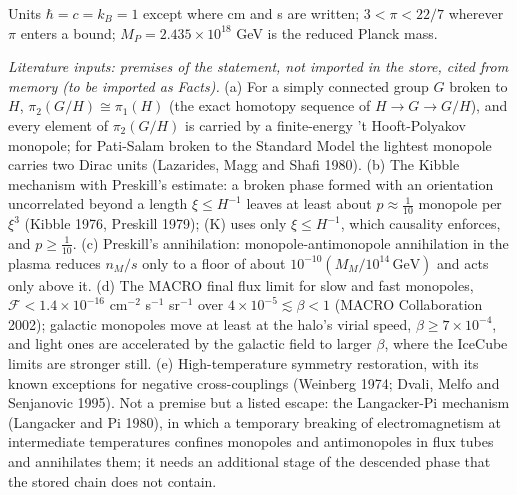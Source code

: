 Units $\hbar = c = k_{B} = 1$ except where cm and s are written; $3 < \pi < 22/7$ wherever $\pi$ enters a bound; $M_{P} = 2.435 \times 10^{18}$ GeV is the reduced Planck mass.

\emph{Literature inputs: premises of the statement, not imported in the store, cited from memory (to be imported as Facts).} (a) For a simply connected group $G$ broken to $H$, $\pi_{2}(G/H) \cong \pi_{1}(H)$ (the exact homotopy sequence of $H \to G \to G/H$), and every element of $\pi_{2}(G/H)$ is carried by a finite-energy 't Hooft-Polyakov monopole; for Pati-Salam broken to the Standard Model the lightest monopole carries two Dirac units (Lazarides, Magg and Shafi 1980). (b) The Kibble mechanism with Preskill's estimate: a broken phase formed with an orientation uncorrelated beyond a length $\xi \le H^{-1}$ leaves at least about $p \approx \tfrac{1}{10}$ monopole per $\xi^{3}$ (Kibble 1976, Preskill 1979); (K) uses only $\xi \le H^{-1}$, which causality enforces, and $p \ge \tfrac{1}{10}$. (c) Preskill's annihilation: monopole-antimonopole annihilation in the plasma reduces $n_{M}/s$ only to a floor of about $10^{-10}(M_{M}/10^{14}\,\mathrm{GeV})$ and acts only above it. (d) The MACRO final flux limit for slow and fast monopoles, $\mathcal{F} < 1.4 \times 10^{-16}$ cm$^{-2}$ s$^{-1}$ sr$^{-1}$ over $4 \times 10^{-5} \lesssim \beta < 1$ (MACRO Collaboration 2002); galactic monopoles move at least at the halo's virial speed, $\beta \ge 7 \times 10^{-4}$, and light ones are accelerated by the galactic field to larger $\beta$, where the IceCube limits are stronger still. (e) High-temperature symmetry restoration, with its known exceptions for negative cross-couplings (Weinberg 1974; Dvali, Melfo and Senjanovic 1995). Not a premise but a listed escape: the Langacker-Pi mechanism (Langacker and Pi 1980), in which a temporary breaking of electromagnetism at intermediate temperatures confines monopoles and antimonopoles in flux tubes and annihilates them; it needs an additional stage of the descended phase that the stored chain does not contain.

